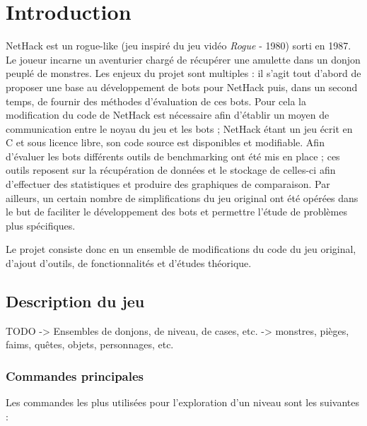 \documentclass[a4paper,12pt]{article}
\begin{document}
\tableofcontents
\pagebreak

\section{Introduction}

NetHack est un rogue-like (jeu inspiré du jeu vidéo \emph{Rogue} - 1980)
sorti en 1987. Le joueur incarne un aventurier chargé de récupérer une
amulette dans un donjon peuplé de monstres.
Les enjeux du projet sont multiples : il s'agit tout d'abord de proposer une
base au développement de bots pour NetHack puis, dans un second temps, de
fournir des méthodes d'évaluation de ces bots. Pour cela la modification du code
de NetHack est nécessaire afin d'établir un moyen de communication entre le
noyau du jeu et les bots ; NetHack étant un jeu écrit en C et sous licence
libre, son code source est disponibles et modifiable. Afin d'évaluer les bots
différents outils de benchmarking ont été mis en place ; ces outils reposent
sur la récupération de données et le stockage de celles-ci afin d'effectuer
des statistiques et produire des graphiques de comparaison.
Par ailleurs, un certain nombre de simplifications du jeu original ont été
opérées dans le but de faciliter le développement des bots et permettre
l'étude de problèmes plus spécifiques.  

Le projet consiste donc en un ensemble de modifications du code du jeu
original, d'ajout d'outils, de fonctionnalités et d'études théorique.

\subsection*{Description du jeu}
TODO
-> Ensembles de donjons, de niveau, de cases, etc.
-> monstres, pièges, faims, quêtes, objets, personnages, etc.

\subsubsection*{Commandes principales}

Les commandes les plus utilisées pour l'exploration d'un niveau sont les suivantes :
\end{document}
